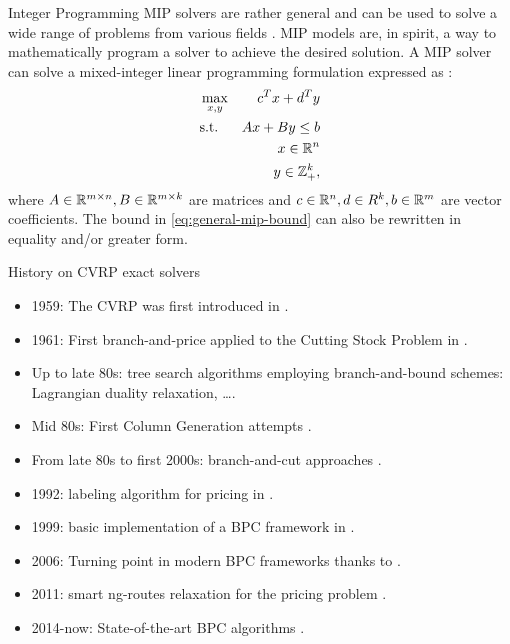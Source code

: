\begin{frame}{Integer Programming}
	MIP solvers are rather general and can be used to solve a wide range of problems from various fields \parencite{bixby2007progress}.
	MIP models are, in spirit, a way to mathematically program a solver to achieve the desired solution.
	A MIP solver can solve a mixed-integer linear programming formulation
	expressed as \parencite{wolsey1999integer}:
	\begin{align}
		 & \max_{x, y} & c^T x + d^T y                                 \\
		 & \text{s.t.} & A x + B y \le b  \label{eq:general-mip-bound} \\
		 &             & x \in \mathbb R^n                                    \\
		 &             & y \in \mathbb Z_{+}^k,
	\end{align}
	where $A \in \mathbb R^{m \times n}, B \in \mathbb R^{m \times k}$ are matrices and
	$c \in \mathbb R^n, d \in R^k, b \in \mathbb R^m$ are vector coefficients.
	The bound in \cref{eq:general-mip-bound} can also be rewritten in equality and/or greater form.
\end{frame}

\begin{frame}{History on CVRP exact solvers}
	\begin{itemize}
		\item 1959: The CVRP was first introduced in \cite{dantzig1959}.
		\item 1961: First branch-and-price applied to the Cutting Stock Problem in \cite{gilmore1961}.
		\item Up to late 80s: tree search algorithms employing branch-and-bound schemes: Lagrangian duality relaxation, \dots.
		\item Mid 80s: First Column Generation attempts \parencite{desrosiers1984, agarwal1989setpartitioningbased}.
		\item From late 80s to first 2000s: branch-and-cut approaches \cite{laporte1983, laporte1985, augerat1995approche, araqueg1994, augerat1995, achuthan1996, blasum2000, ralphs2003, achuthan2003, baldacci2004}.
		\item 1992: labeling algorithm for pricing in \cite{desrochers1992}.
		\item 1999: basic implementation of a BPC framework in \cite{kohl1999}.
		\item 2006: Turning point in modern BPC frameworks thanks to \parencite{fukasawa2006}.
		\item 2011: smart ng-routes relaxation for the pricing problem \parencite{baldacci2011}.
		\item 2014-now: State-of-the-art BPC algorithms \parencite{contardo2014,pecin2017improved,pecin2017new,pessoa2020,sadykov2021,pessoa2020generic}.
	\end{itemize}
\end{frame}

